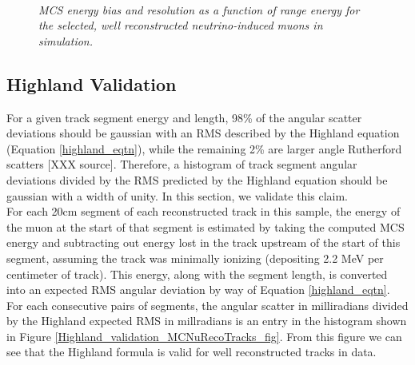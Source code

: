 \begin{figure}
\centering
\mbox{
	\quad
	}
\caption{\textit{MCS energy bias and resolution as a function of range energy for the selected, well reconstructed neutrino-induced muons in {\ub} simulation.}}
\label{MCS_range_bias_resolution_MCNuRecoTrack_fig}
\end{figure}



\subsection{Highland Validation}\label{Highland_Validation_MCNuRecoTrack_section}
For a given track segment energy and length, 98\% of the angular scatter deviations should be gaussian with an RMS described by the Highland equation (Equation \ref{highland_eqtn}), while the remaining 2\% are larger angle Rutherford scatters [XXX source]. Therefore, a histogram of track segment angular deviations divided by the RMS predicted by the Highland equation should be gaussian with a width of unity. In this section, we validate this claim.\\

For each 20cm segment of each reconstructed track in this sample, the energy of the muon at the start of that segment is estimated by taking the computed MCS energy and subtracting out energy lost in the track upstream of the start of this segment, assuming the track was minimally ionizing (depositing 2.2 MeV per centimeter of track). This energy, along with the segment length, is converted into an expected RMS angular deviation by way of Equation \ref{highland_eqtn}. For each consecutive pairs of segments, the angular scatter in milliradians divided by the Highland expected RMS in millradians is an entry in the histogram shown in Figure \ref{Highland_validation_MCNuRecoTracks_fig}. From this figure we can see that the Highland formula is valid for well reconstructed tracks in data.

